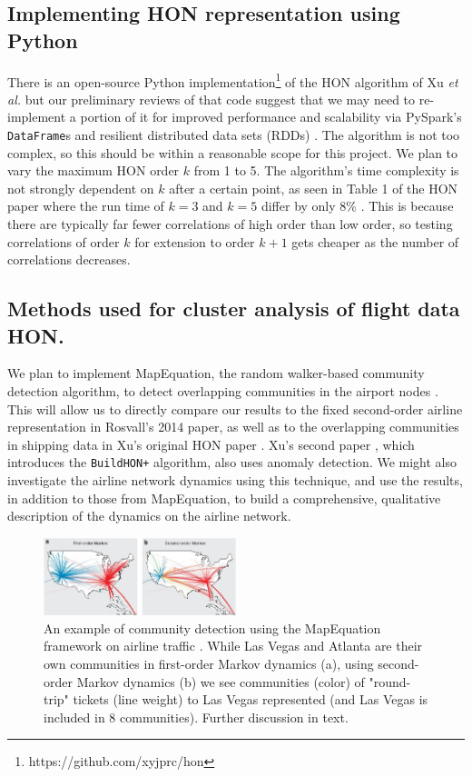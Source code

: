 \documentclass[sigconf]{acmart}
\begin{document}
\subsection{Implementing HON representation using Python}
There is an open-source Python implementation\footnote{https://github.com/xyjprc/hon} of the HON algorithm of Xu \textit{et al.} but our preliminary reviews of that code suggest that we may need to re-implement a portion of it for improved performance and scalability via PySpark's \texttt{DataFrame}s and resilient distributed data sets (RDDs) \cite{Xu2016,Xu2017}. The algorithm is not too complex, so this should be within a reasonable scope for this project. We plan to vary the maximum HON order $k$ from 1 to 5. The algorithm's time complexity is not strongly dependent on $k$ after a certain point, as seen in Table 1 of the HON paper where the run time of $k = 3$ and $k = 5$ differ by only 8\% \cite{Xu2016}. This is because there are typically far fewer correlations of high order than low order, so testing correlations of order $k$ for extension to order $k+1$ gets cheaper as the number of correlations decreases.

\subsection{Methods used for cluster analysis of flight data HON.} We plan to implement MapEquation, the random walker-based community detection algorithm, to detect overlapping communities in the airport nodes \cite{Rosvall2009}. This will allow us to directly compare our results to the fixed second-order airline representation in Rosvall's 2014 paper, as well as to the overlapping communities in shipping data in Xu's original HON paper \cite{Rosvall2014, Xu2016}. Xu's second paper \cite{Xu2017}, which introduces the \texttt{BuildHON+} algorithm, also uses anomaly detection. We might also investigate the airline network dynamics using this technique, and use the results, in addition to those from MapEquation, to build a comprehensive, qualitative description of the dynamics on the airline network.

\begin{figure}
    \centering
    \includegraphics[width=0.5\textwidth]{air_modules.jpg}
    \caption{An example of community detection using the MapEquation framework on airline traffic \cite{Rosvall2014}. While Las Vegas and Atlanta are their own communities in first-order Markov dynamics (a), using second-order Markov dynamics (b) we see communities (color) of "round-trip" tickets (line weight) to Las Vegas represented (and Las Vegas is included in 8 communities). Further discussion in text.}
    \label{fig:clustering}
\end{figure}
\end{document}
